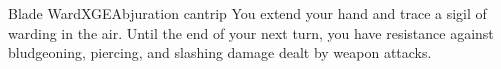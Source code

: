 \begin{spell}{Blade Ward}{XGE}{Abjuration cantrip}
{
}
You extend your hand and trace a sigil of warding in the
air. Until the end of your next turn, you have resistance
against bludgeoning, piercing, and slashing damage dealt by
weapon attacks.
\end{spell}
